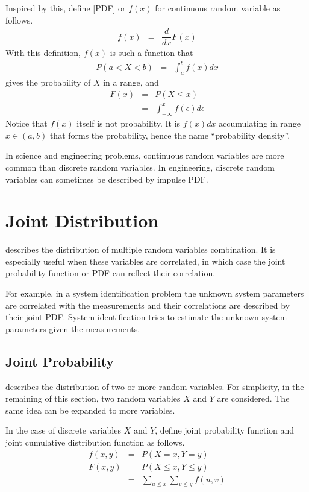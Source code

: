 Inspired by this, define [PDF] or $f(x)$ for continuous random variable as follows. 
\begin{eqnarray}
f(x) &=& \dfrac{d}{dx}F(x) \nonumber
\end{eqnarray}
With this definition, $f(x)$ is such a function that
\begin{eqnarray}
  P(a < X < b) &=& \int_{a}^{b}f(x)dx \nonumber
\end{eqnarray}
gives the probability of $X$ in a range, and
\begin{eqnarray}
  F(x) &=& P(X\leq x) \nonumber \\
  &=& \int_{-\infty}^{x} f(\epsilon)d\epsilon \nonumber
\end{eqnarray}
Notice that $f(x)$ itself is not probability. It is $f(x)dx$ accumulating in range $x \in (a, b)$ that forms the probability, hence the name ``probability density''.

In science and engineering problems, continuous random variables are more common than discrete random variables. In engineering, discrete random variables can sometimes be described by impulse PDF.

\section{Joint Distribution}

 describes the distribution of multiple random variables combination. It is especially useful when these variables are correlated, in which case the joint probability function or PDF can reflect their correlation. 

For example, in a system identification problem the unknown system parameters are correlated with the measurements and their correlations are described by their joint PDF. System identification tries to estimate the unknown system parameters given the measurements.

\subsection{Joint Probability}

 describes the distribution of two or more random variables. For simplicity, in the remaining of this section, two random variables $X$ and $Y$ are considered. The same idea can be expanded to more variables.

In the case of discrete variables $X$ and $Y$, define joint probability function and joint cumulative distribution function as follows.
\begin{eqnarray}
  f(x, y) &=& P\left(X=x, Y=y\right) \nonumber \\
  F(x, y) &=& P\left(X\leq x, Y\leq y\right) \nonumber \\
  &=& \sum_{u\leq x}\sum_{v\leq y}f(u, v) \nonumber
\end{eqnarray}

